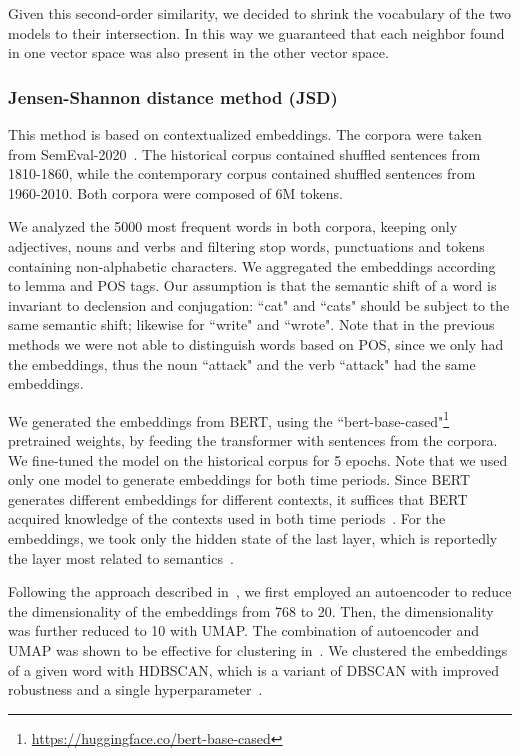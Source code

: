 \documentclass[runningheads]{llncs}
\begin{document}
Given this second-order similarity, we decided to shrink the vocabulary of the two models to their intersection. In this way we guaranteed that each neighbor found in one vector space was also present in the other vector space. 

\subsubsection{Jensen-Shannon distance method (JSD)} This method is based on contextualized embeddings. The corpora were taken from SemEval-2020~\cite{schlechtweg-etal-2020-semeval}. The historical corpus contained shuffled sentences from 1810-1860, while the contemporary corpus contained shuffled sentences from 1960-2010. Both corpora were composed of 6M tokens.

We analyzed the 5000 most frequent words in both corpora, keeping only adjectives, nouns and verbs and filtering stop words, punctuations and tokens containing non-alphabetic characters. We aggregated the embeddings according to lemma and POS tags. Our assumption is that the semantic shift of a word is invariant to declension and conjugation: “cat" and “cats" should be subject to the same semantic shift; likewise for “write" and “wrote". Note that in the previous methods we were not able to distinguish words based on POS, since we only had the embeddings, thus the noun “attack" and the verb “attack" had the same embeddings.

We generated the embeddings from BERT, using the “bert-base-cased"\footnote{\url{https://huggingface.co/bert-base-cased}} pretrained weights, by feeding the transformer with sentences from the corpora. We fine-tuned the model on the historical corpus for 5 epochs. Note that we used only one model to generate embeddings for both time periods. Since BERT generates different embeddings for different contexts, it suffices that BERT acquired knowledge of the contexts used in both time periods~\cite{martinc-etal-2020-leveraging}. For the embeddings, we took only the hidden state of the last layer, which is reportedly the layer most related to semantics~\cite{laicher-etal-2021-explaining}.

Following the approach described in~\cite{rother-etal-2020-cmce}, we first employed an autoencoder to reduce the dimensionality of the embeddings from 768 to 20. Then, the dimensionality was further reduced to 10 with UMAP. The combination of autoencoder and UMAP was shown to be effective for clustering in~\cite{mcconville-etal-2019-n2d}. We clustered the embeddings of a given word with HDBSCAN, which is a variant of DBSCAN with improved robustness and a single hyperparameter~\cite{campello-etal-2013-hdbscan}. 
\end{document}
